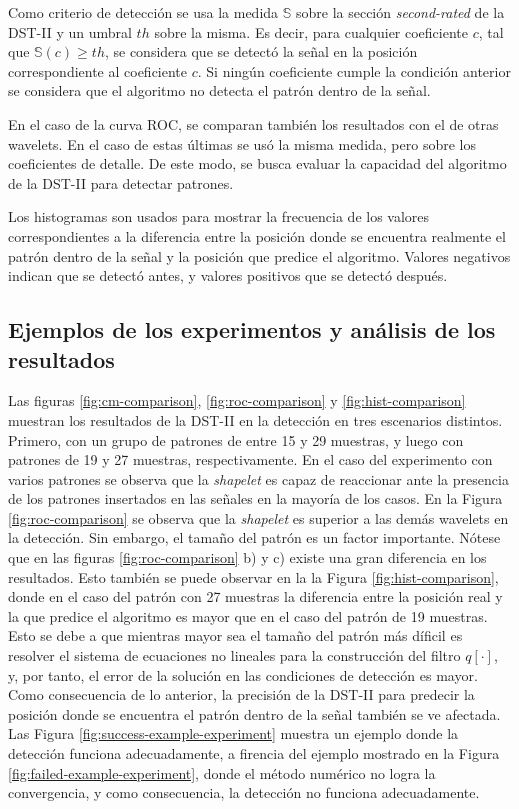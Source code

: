 Como criterio de detección se usa la medida $\mathbb{S}$ sobre la sección \textit{second-rated} de la
DST-II y un umbral $th$ sobre la misma. Es decir, para cualquier coeficiente $c$, tal que $\mathbb{S}(c)\geq th$, se considera
que se detectó la señal en la posición correspondiente al coeficiente $c$. Si ningún coeficiente cumple la condición
anterior se considera que el algoritmo no detecta el patrón dentro de la señal. 

En el caso de la curva ROC, se comparan también los resultados con el de otras wavelets. En el caso de estas
últimas se usó la misma medida, pero sobre los coeficientes de detalle. De este modo, se busca evaluar 
la capacidad del algoritmo de la DST-II para detectar patrones.

Los histogramas son usados para mostrar la frecuencia de los valores correspondientes a la diferencia entre
la posición donde se encuentra realmente el patrón dentro de la señal y la posición que predice el algoritmo.
Valores negativos indican que se detectó antes, y valores positivos que se detectó después.

\subsection{Ejemplos de los experimentos y análisis de los resultados}

Las figuras \ref{fig:cm-comparison}, \ref{fig:roc-comparison} y \ref{fig:hist-comparison} 
muestran los resultados de la DST-II en la detección en tres escenarios distintos.
Primero, con un grupo de patrones de entre 15 y 29 muestras, y luego con patrones de 19 y 27 
muestras, respectivamente. En el caso del experimento con varios patrones se observa que 
la \textit{shapelet} es capaz de reaccionar ante la presencia de los patrones insertados en las señales en 
la mayoría de los casos. En la Figura \ref{fig:roc-comparison} se observa que la \textit{shapelet}
es superior a las demás wavelets en la detección. Sin embargo, el tamaño del patrón es un factor
importante. Nótese que en las figuras \ref{fig:roc-comparison} b) y c) existe una gran diferencia
en los resultados. Esto también se puede observar en la la Figura \ref{fig:hist-comparison}, donde 
en el caso del patrón con 27 muestras
la diferencia entre la posición real y la que predice el algoritmo es mayor que en el caso del patrón 
de 19 muestras. Esto se debe a que mientras mayor sea el tamaño del patrón más díficil es resolver
el sistema de ecuaciones no lineales para la construcción del filtro $q[\cdot]$, y, por tanto, el error
de la solución en las condiciones de detección es mayor. Como consecuencia de lo anterior,
la precisión de la DST-II para predecir la posición donde se encuentra el patrón dentro de la señal también
se ve afectada. Las Figura \ref{fig:success-example-experiment} muestra un ejemplo donde la detección
funciona adecuadamente, a firencia del ejemplo mostrado en la Figura \ref{fig:failed-example-experiment}, donde
el método numérico no logra la convergencia, y como consecuencia, la detección no funciona adecuadamente.

